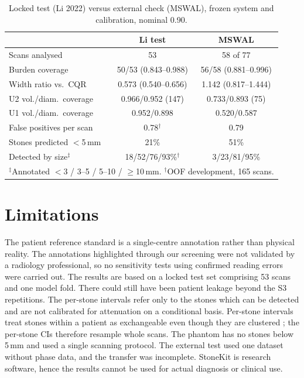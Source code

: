 \documentclass[conference]{IEEEtran}
\begin{document}
\begin{table}[t]
\caption{Locked test (Li 2022) versus external check (MSWAL), frozen system and calibration, nominal 0.90.}
\label{tab:external}
\centering\footnotesize
\setlength{\tabcolsep}{2.5pt}
\begin{tabular}{lcc}
\toprule
 & Li test & MSWAL \\
\midrule
Scans analysed & 53 & 58 of 77 \\
Burden coverage & 50/53 (0.843--0.988) & 56/58 (0.881--0.996) \\
Width ratio vs.\ CQR & 0.573 (0.540--0.656) & 1.142 (0.817--1.444) \\
U2 vol./diam.\ coverage & 0.966/0.952 (147) & 0.733/0.893 (75) \\
U1 vol./diam.\ coverage & 0.952/0.898 & 0.520/0.587 \\
False positives per scan & 0.78$^{\dagger}$ & 0.79 \\
Stones predicted $<$5\,mm & 21\% & 51\% \\
Detected by size$^{\ddagger}$ & 18/52/76/93\%$^{\dagger}$ & 3/23/81/95\% \\
\bottomrule
\multicolumn{3}{l}{\scriptsize $^{\ddagger}$Annotated $<$3 / 3--5 / 5--10 / $\ge$10\,mm. $^{\dagger}$OOF development, 165 scans.}
\end{tabular}
\end{table}

\section{Limitations}
The patient reference standard is a single-centre annotation rather than physical reality. The annotations highlighted through our screening were not validated by a radiology professional, so no sensitivity tests using confirmed reading errors were carried out. The results are based on a locked test set comprising 53 scans and one model fold. There could still have been patient leakage beyond the S3 repetitions. The per-stone intervals refer only to the stones which can be detected and are not calibrated for attenuation on a conditional basis. Per-stone intervals treat stones within a patient as exchangeable even though they are clustered \cite{dunn2023}; the per-stone CIs therefore resample whole scans. The phantom has no stones below 5\,mm and used a single scanning protocol. The external test used one dataset without phase data, and the transfer was incomplete. StoneKit is research software, hence the results cannot be used for actual diagnosis or clinical use.
\end{document}
